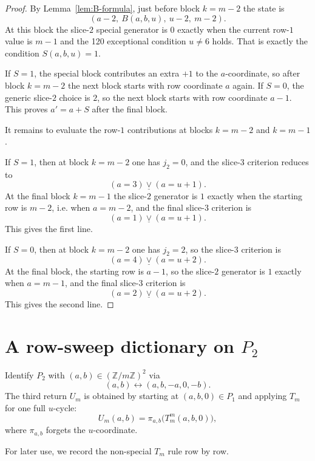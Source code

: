 \documentclass[11pt]{article}
\newcommand{\Z}{\mathbb Z}
\newcommand{\1}{\mathbf 1}
\newcommand{\xor}{\mathbin{\underline{\vee}}}
\begin{document}
\begin{proof}
By Lemma~\ref{lem:B-formula}, just before block $k=m-2$ the state is
\[
(a-2,\ B(a,b,u),\ u-2,\ m-2).
\]
At this block the slice-$2$ special generator is $0$ exactly when the current
row-$1$ value is $m-1$ and the 120 exceptional condition $u\ne 6$ holds.
That is exactly the condition $S(a,b,u)=1$.

If $S=1$, the special block contributes an extra $+1$ to the $a$-coordinate, so
after block $k=m-2$ the next block starts with row coordinate $a$ again.
If $S=0$, the generic slice-$2$ choice is $2$, so the next block starts with
row coordinate $a-1$. This proves $a'=a+S$ after the final block.

It remains to evaluate the row-$1$ contributions at blocks $k=m-2$ and
$k=m-1$.

If $S=1$, then at block $k=m-2$ one has $j_2=0$, and the slice-$3$ criterion
reduces to
\[
(a=3)\xor(a=u+1).
\]
At the final block $k=m-1$ the slice-$2$ generator is $1$ exactly when the
starting row is $m-2$, i.e. when $a=m-2$, and the final slice-$3$ criterion is
\[
(a=1)\xor(a=u+1).
\]
This gives the first line.

If $S=0$, then at block $k=m-2$ one has $j_2=2$, so the slice-$3$ criterion is
\[
(a=4)\xor(a=u+2).
\]
At the final block, the starting row is $a-1$, so the slice-$2$ generator is
$1$ exactly when $a=m-1$, and the final slice-$3$ criterion is
\[
(a=2)\xor(a=u+2).
\]
This gives the second line.
\end{proof}

\section{A row-sweep dictionary on $P_2$}

Identify $P_2$ with $(a,b)\in(\Z/m\Z)^2$ via
\[
(a,b)\longleftrightarrow (a,b,-a,0,-b).
\]
The third return $U_m$ is obtained by starting at $(a,b,0)\in P_1$ and applying
$T_m$ for one full $u$-cycle:
\[
U_m(a,b)=\pi_{a,b}\bigl(T_m^m(a,b,0)\bigr),
\]
where $\pi_{a,b}$ forgets the $u$-coordinate.

For later use, we record the non-special $T_m$ rule row by row.
\end{document}
